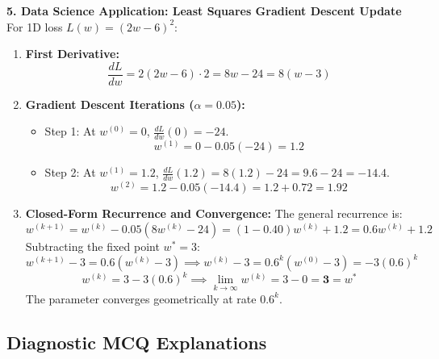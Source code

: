 \textbf{5. Data Science Application: Least Squares Gradient Descent Update}
For 1D loss $L(w) = (2w - 6)^2$:
\begin{enumerate}
    \item \textbf{First Derivative:}
    \begin{equation*}
    \frac{dL}{dw} = 2(2w - 6) \cdot 2 = 8w - 24 = 8(w - 3)
    \end{equation*}
    \item \textbf{Gradient Descent Iterations ($\alpha = 0.05$):}
    \begin{itemize}
        \item Step 1: At $w^{(0)} = 0$, $\frac{dL}{dw}(0) = -24$.
        \begin{equation*}
        w^{(1)} = 0 - 0.05(-24) = \mathbf{1.2}
        \end{equation*}
        \item Step 2: At $w^{(1)} = 1.2$, $\frac{dL}{dw}(1.2) = 8(1.2) - 24 = 9.6 - 24 = -14.4$.
        \begin{equation*}
        w^{(2)} = 1.2 - 0.05(-14.4) = 1.2 + 0.72 = \mathbf{1.92}
        \end{equation*}
    \end{itemize}
    \item \textbf{Closed-Form Recurrence and Convergence:}
    The general recurrence is:
    \begin{equation*}
    w^{(k+1)} = w^{(k)} - 0.05(8w^{(k)} - 24) = (1 - 0.40) w^{(k)} + 1.2 = 0.6 w^{(k)} + 1.2
    \end{equation*}
    Subtracting the fixed point $w^* = 3$:
    \begin{equation*}
    w^{(k+1)} - 3 = 0.6(w^{(k)} - 3) \implies w^{(k)} - 3 = 0.6^k (w^{(0)} - 3) = -3(0.6)^k
    \end{equation*}
    \begin{equation*}
    w^{(k)} = 3 - 3(0.6)^k \implies \lim_{k \to \infty} w^{(k)} = 3 - 0 = \mathbf{3} = w^*
    \end{equation*}
    The parameter converges geometrically at rate $0.6^k$.
\end{enumerate}

\subsection*{Diagnostic MCQ Explanations}

